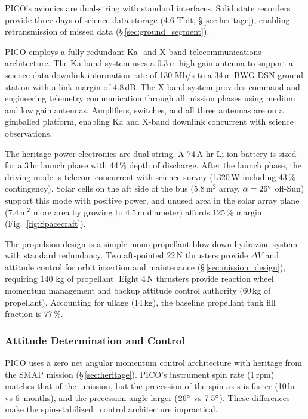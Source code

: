 PICO's avionics are dual-string with standard interfaces. Solid state recorders provide three days of science data storage (4.6 Tbit, \S\,\ref{sec:heritage}), enabling retransmission of missed data (\S\,\ref{sec:ground_segment}).

PICO employs a fully redundant Ka- and X-band telecommunications
architecture. The Ka-band system uses a 0.3\,m high-gain antenna to
support a science data downlink information rate of 130 Mb/s to a
34\,m BWG DSN ground station with a link margin of 4.8\,dB. The X-band
system provides command and engineering telemetry communication
through all mission phases using medium and low gain
antennas. Amplifiers, switches, and all three antennas are on a
gimballed platform, enabling Ka and X-band downlink concurrent with
science observations.

 The heritage power electronics are dual-string.
A 74\,A-hr Li-ion battery is sized for a 3\,hr launch phase with 44\,\% depth of discharge.
After the launch phase, the driving
mode is telecom concurrent with science survey (1320\,W including 43\,\% contingency).
Solar cells on the aft side of the bus (5.8\,m$^2$ array, $\alpha=26^\circ$ off-Sun) support this mode with positive power,  and unused area in the solar array plane (7.4\,m$^2$ more area by growing to 4.5\,m diameter) affords 125\,\% margin
(Fig.~\ref{fig:Spacecraft}).

The propulsion design is a simple mono-propellant blow-down hydrazine
system with standard redundancy. Two aft-pointed 22\,N thrusters
provide $\Delta V$ and attitude control for orbit insertion and
maintenance (\S\,\ref{sec:mission_design}), requiring 140 kg of
propellant.  Eight 4\,N thrusters provide reaction wheel momentum
management and backup attitude control authority (60\,kg of
propellant). Accounting for ullage (14\,kg), the baseline propellant
tank fill fraction is 77\,\%.


\subsubsection{Attitude Determination and Control}
\label{sec:attitude_determination} %

PICO uses a zero net angular momentum control architecture with heritage from the SMAP mission (\S\,\ref{sec:heritage}). PICO's instrument spin rate (1\,rpm) matches that of the \planck\ mission, but the precession of the spin axis is faster (10\,hr vs 6\, months), and the precession angle larger ($26^\circ$ vs $7.5^\circ$). These differences make the spin-stabilized \planck \ control architecture impractical. 

